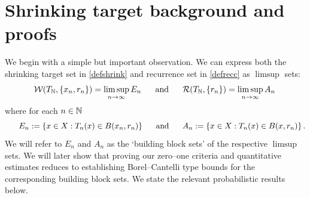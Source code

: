 \documentclass[11pt,reqno]{amsart}
\newcommand{\N}{{\Bbb N}}
\newcommand{\0}{\mathbf{0}}
\theoremstyle{remark}
\numberwithin{equation}{section}
\theoremstyle{remark}
\numberwithin{equation}{section}
\newcommand{\cR}{\mathcal{R}}
\begin{document}
\medskip
\section{Shrinking target background and proofs}\label{shrink}
We begin with a simple but important observation. We can express both the shrinking target set in \eqref{defshrink} and recurrence set in \eqref{defrecc} as $\limsup$ sets: 
$$\mathcal{W}(T_\N,\{x_n, r_n\}) = \limsup\limits_{n \to \infty}E_n \quad \text{ \ and \ } \quad 
\cR(T_\N,\{r_n\})= \limsup\limits_{n \to \infty} A_n \, $$  where for each $n \in \N$ $$ ~\hspace{4.5mm} E_n:= \{ x \in X: T_n(x) \in B(x_n,r_n)\} \quad \text{ \ and \ } \quad  A_n :=  \{x \in X: T_n(x) \in B(x,r_n)\} \, .$$ 
We will refer to $E_n$ and $A_n$ as the `building block sets' of the respective $\limsup$ sets. 
We will later show that proving our zero–one criteria and quantitative estimates reduces to establishing Borel–Cantelli type bounds for the corresponding building block sets. We state the relevant probabilistic results below.
\end{document}

